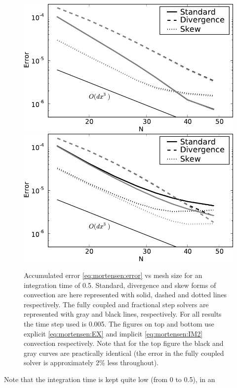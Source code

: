 \begin{figure}
  \centering
  \includegraphics[width=\smallfig]{chapters/mortensen/pdf/OS_init_dx_1.pdf}
  \includegraphics[width=\smallfig]{chapters/mortensen/pdf/OS_init_dx_0.pdf}
%
 \caption{Accumulated error \eqref{eq:mortensen:error} vs mesh size
   for an integration time of 0.5. Standard, divergence and skew forms
   of convection are here represented with solid, dashed and dotted
   lines respectively. The fully coupled and fractional step solvers
   are represented with gray and black lines, respectively. For all
   results the time step used is 0.005. The figures on top and bottom
   use explicit \eqref{eq:mortensen:EX} and implicit \eqref{eq:mortensen:IM2}
   convection respectively. Note that for the top figure the black and
   gray curves are practically identical (the error in the fully
   coupled solver is approximately 2\% less throughout). }
\label{fig:mortensen:OS_init_dx}
\end{figure}
Note that the integration time is kept quite low (from 0 to 0.5), in an
